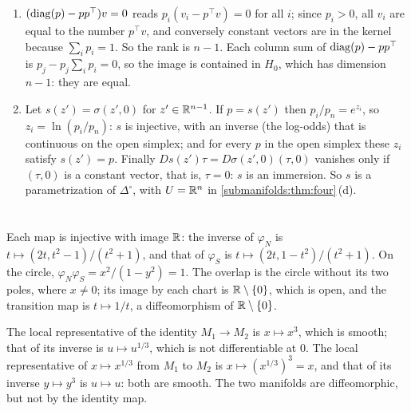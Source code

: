 \begin{enumerate}[nosep]
  \item $(\operatorname{diag}(p) - pp^\top)v = 0$ reads $p_i(v_i - p^\top v) = 0$ for
        all $i$; since $p_i > 0$, all $v_i$ are equal to the number
        $p^\top v$, and conversely constant vectors are in the kernel
        because $\sum_ip_i = 1$. So the rank is $n - 1$. Each column sum
        of $\operatorname{diag}(p) - pp^\top$ is $p_j - p_j\sum_ip_i = 0$, so the image
        is contained in $H_0$, which has dimension $n - 1$: they are
        equal.
  \item Let $s(z') = \sigma(z', 0)$ for $z'\in\mathbb{R}^{n-1}$. If $p = s(z')$
        then $p_i/p_n = e^{z_i}$, so $z_i = \ln(p_i/p_n)$: $s$ is
        injective, with an inverse (the log-odds) that is continuous on
        the open simplex; and for every $p$ in the open simplex these
        $z_i$ satisfy $s(z') = p$. Finally
        $Ds(z')\tau = D\sigma(z', 0)(\tau, 0)$ vanishes only if
        $(\tau, 0)$ is a constant vector, that is, $\tau = 0$: $s$ is an
        immersion. So $s$ is a parametrization of $\Delta^\circ$, with
        $U = \mathbb{R}^n$ in \cref{submanifolds:thm:four}\,(d).
\end{enumerate}

\section{}

Each map is injective with image $\mathbb{R}$: the inverse of $\varphi_N$ is
$t\mapsto(2t, t^2 - 1)/(t^2 + 1)$, and that of $\varphi_S$ is
$t\mapsto(2t, 1 - t^2)/(t^2 + 1)$. On the circle,
$\varphi_N\varphi_S = x^2/(1 - y^2) = 1$. The overlap is the circle
without its two poles, where $x\neq0$; its image by each chart is
$\mathbb{R}\setminus\{0\}$, which is open, and the transition map is
$t\mapsto1/t$, a diffeomorphism of $\mathbb{R}\setminus\{0\}$.

The local representative of the identity $M_1\to M_2$ is
$x\mapsto x^3$, which is smooth; that of its inverse is
$u\mapsto u^{1/3}$, which is not differentiable at $0$. The local
representative of $x\mapsto x^{1/3}$ from $M_1$ to $M_2$ is
$x\mapsto(x^{1/3})^3 = x$, and that of its inverse $y\mapsto y^3$ is
$u\mapsto u$: both are smooth. The two manifolds are diffeomorphic, but
not by the identity map.

